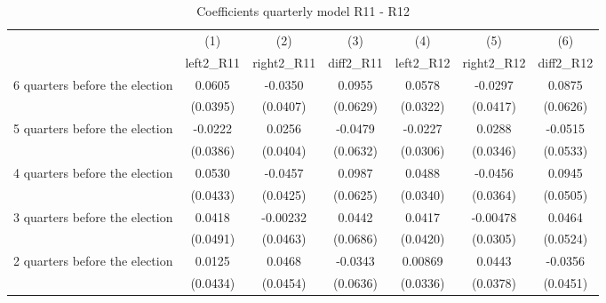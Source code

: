 \begin{table}[!ht]\centering \footnotesize
\def\sym#1{\ifmmode^{#1}\else\(^{#1}\)\fi}
\caption{Coefficients quarterly model R11 - R12}
\begin{tabular}{l*{6}{c}}
\hline\hline
                    &\multicolumn{1}{c}{(1)}&\multicolumn{1}{c}{(2)}&\multicolumn{1}{c}{(3)}&\multicolumn{1}{c}{(4)}&\multicolumn{1}{c}{(5)}&\multicolumn{1}{c}{(6)}\\
                    &\multicolumn{1}{c}{left2\_R11}&\multicolumn{1}{c}{right2\_R11}&\multicolumn{1}{c}{diff2\_R11}&\multicolumn{1}{c}{left2\_R12}&\multicolumn{1}{c}{right2\_R12}&\multicolumn{1}{c}{diff2\_R12}\\
\hline
 6 quarters before the election&      0.0605         &     -0.0350         &      0.0955         &      0.0578         &     -0.0297         &      0.0875         \\
                    &    (0.0395)         &    (0.0407)         &    (0.0629)         &    (0.0322)         &    (0.0417)         &    (0.0626)         \\
[1em]
 5 quarters before the election&     -0.0222         &      0.0256         &     -0.0479         &     -0.0227         &      0.0288         &     -0.0515         \\
                    &    (0.0386)         &    (0.0404)         &    (0.0632)         &    (0.0306)         &    (0.0346)         &    (0.0533)         \\
[1em]
 4 quarters before the election&      0.0530         &     -0.0457         &      0.0987         &      0.0488         &     -0.0456         &      0.0945         \\
                    &    (0.0433)         &    (0.0425)         &    (0.0625)         &    (0.0340)         &    (0.0364)         &    (0.0505)         \\
[1em]
 3 quarters before the election&      0.0418         &    -0.00232         &      0.0442         &      0.0417         &    -0.00478         &      0.0464         \\
                    &    (0.0491)         &    (0.0463)         &    (0.0686)         &    (0.0420)         &    (0.0305)         &    (0.0524)         \\
[1em]
 2 quarters before the election&      0.0125         &      0.0468         &     -0.0343         &     0.00869         &      0.0443         &     -0.0356         \\
                    &    (0.0434)         &    (0.0454)         &    (0.0636)         &    (0.0336)         &    (0.0378)         &    (0.0451)         \\

\end{tabular}
\end{table}
